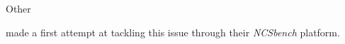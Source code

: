Other 


\textcite{Zoppi2020NCSBench} made a first attempt at tackling this issue through their \emph{NCSbench} platform.


